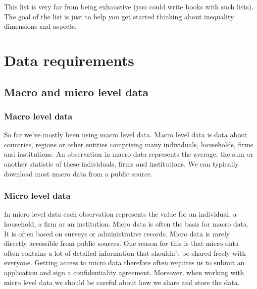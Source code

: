 \documentclass[
]{book}
\begin{document}
This list is very far from being exhaustive (you could write books with such lists). The goal of the list is just to help you get started thinking about inequality dimensions and aspects.

\hypertarget{data-requirements-2}{%
\section{Data requirements}\label{data-requirements-2}}

\hypertarget{macro-and-micro-level-data}{%
\subsection{Macro and micro level data}\label{macro-and-micro-level-data}}

\hypertarget{macro-level-data}{%
\subsubsection*{Macro level data}\label{macro-level-data}}

So far we've mostly been using macro level data. Macro level data is data about countries, regions or other entities comprising many individuals, households, firms and institutions. An observation in macro data represents the average, the sum or another statistic of these individuals, firms and institutions. We can typically download most macro data from a public source.

\hypertarget{micro-level-data}{%
\subsubsection*{Micro level data}\label{micro-level-data}}

In micro level data each observation represents the value for an individual, a household, a firm or an institution. Micro data is often the basis for macro data. It is often based on surveys or administrative records. Micro data is rarely directly accessible from public sources. One reason for this is that micro data often contains a lot of detailed information that shouldn't be shared freely with everyone. Getting access to micro data therefore often requires us to submit an application and sign a confidentiality agreement. Moreover, when working with micro level data we should be careful about how we share and store the data.
\end{document}
